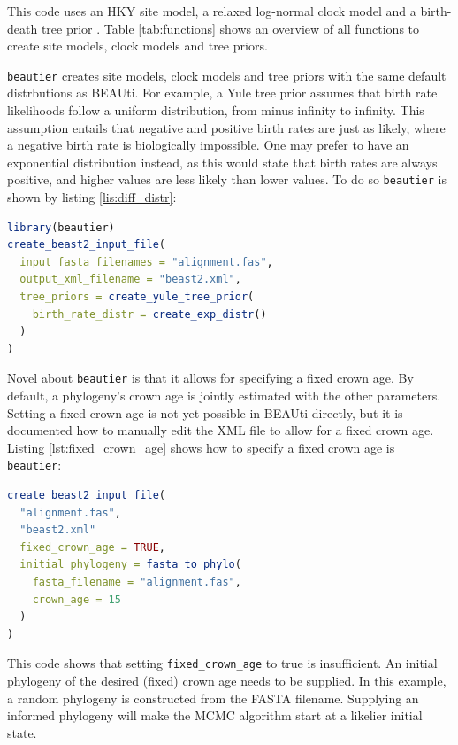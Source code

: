 \documentclass{article}
\begin{document}
This code uses an HKY site model, a relaxed log-normal clock model and a birth-death tree prior \cite{kendall1948generalized}.
Table \ref{tab:functions} shows an overview of all functions to create site models, clock models and tree priors.

\verb;beautier; creates site models, clock models and tree priors with the same default distrbutions as BEAUti.
For example, a Yule tree prior assumes that birth rate likelihoods follow a uniform distribution, from minus infinity
to infinity. This assumption entails that negative and positive birth rates are just as likely, where a negative birth rate is biologically impossible. 
One may prefer to have an exponential distribution instead, as this would state that birth rates are always positive, and
higher values are less likely than lower values. To do so \verb;beautier; is shown by listing \ref{lis:diff_distr}:


\begin{lstlisting}[language=R, caption=Example with Yule tree prior with different birth rate distribution, label=lst:diff_distr, floatplacement=H]
library(beautier)
create_beast2_input_file(
  input_fasta_filenames = "alignment.fas",
  output_xml_filename = "beast2.xml",
  tree_priors = create_yule_tree_prior(
    birth_rate_distr = create_exp_distr()    
  )
)
\end{lstlisting}

Novel about \verb;beautier; is that it allows for specifying a fixed crown age. 
By default, a phylogeny's crown age is jointly estimated with the other parameters.
Setting a fixed crown age is not yet possible in BEAUti directly, but it is documented how to 
manually edit the XML file to allow for a fixed crown age. Listing \ref{lst:fixed_crown_age} shows how to specify a fixed crown age is \verb;beautier;:

\begin{lstlisting}[language=R, caption=Example with fixed crown age, label=lst:fixed_crown_age, floatplacement=H]
create_beast2_input_file(
  "alignment.fas",
  "beast2.xml"
  fixed_crown_age = TRUE,
  initial_phylogeny = fasta_to_phylo(
    fasta_filename = "alignment.fas", 
    crown_age = 15
  )
)
\end{lstlisting}

This code shows that setting \verb;fixed_crown_age; to true is insufficient. An
initial phylogeny of the desired (fixed) crown age needs to be supplied. In this
example, a random phylogeny is constructed from the FASTA filename. Supplying an 
informed phylogeny will make the MCMC algorithm start at a likelier initial state.
\end{document}
